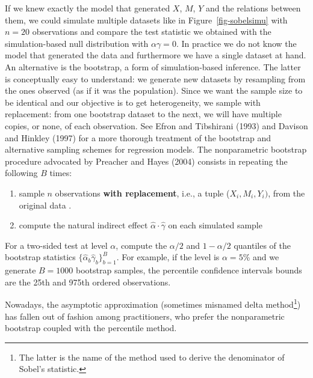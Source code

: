 \documentclass[
  11pt,
  letterpaper,
]{scrbook}
\providecommand{\tightlist}{%
  \setlength{\itemsep}{0pt}\setlength{\parskip}{0pt}}\usepackage{longtable,booktabs,array}
\theoremstyle{definition}
\theoremstyle{remark}
\begin{document}
If we knew exactly the model that generated \(X\), \(M\), \(Y\) and the
relations between them, we could simulate multiple datasets like in
Figure~\ref{fig-sobelsimu} with \(n=20\) observations and compare the
test statistic we obtained with the simulation-based null distribution
with \(\alpha\gamma=0\). In practice we do not know the model that
generated the data and furthermore we have a single dataset at hand. An
alternative is the bootstrap, a form of simulation-based inference. The
latter is conceptually easy to understand: we generate new datasets by
resampling from the ones observed (as if it was the population). Since
we want the sample size to be identical and our objective is to get
heterogeneity, we sample with replacement: from one bootstrap dataset to
the next, we will have multiple copies, or none, of each observation.
See Efron and Tibshirani (1993) and Davison and Hinkley (1997) for a
more thorough treatment of the bootstrap and alternative sampling
schemes for regression models. The nonparametric bootstrap procedure
advocated by Preacher and Hayes (2004) consists in repeating the
following \(B\) times:

\begin{enumerate}
\def\labelenumi{\arabic{enumi})}
\tightlist
\item
  sample \(n\) observations \textbf{with replacement}, i.e., a tuple
  (\(X_i, M_i, Y_i)\), from the original data .
\item
  compute the natural indirect effect
  \(\widehat{\alpha}\cdot\widehat{\gamma}\) on each simulated sample
\end{enumerate}

For a two-sided test at level \(\alpha\), compute the \(\alpha/2\) and
\(1-\alpha/2\) quantiles of the bootstrap statistics
\(\{\widehat{\alpha}_b\widehat{\gamma}_b\}_{b=1}^B\). For example, if
the level is \(\alpha=5\)\% and we generate \(B=1000\) bootstrap
samples, the percentile confidence intervals bounds are the 25th and
975th ordered observations.

Nowadays, the asymptotic approximation (sometimes misnamed delta
method\footnote{The latter is the name of the method used to derive the
  denominator of Sobel's statistic.}) has fallen out of fashion among
practitioners, who prefer the nonparametric bootstrap coupled with the
percentile method.
\end{document}
